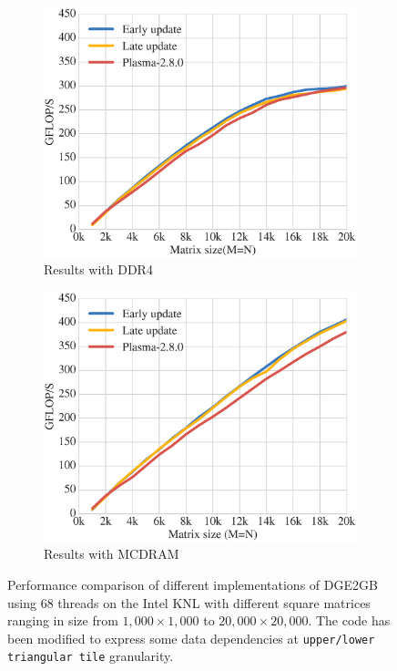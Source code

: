 \begin{figure}[h!]
  \begin{subfigure}[t]{0.5 \textwidth}
    \includegraphics[width=\textwidth]{fig/dge2gb_KNL_HACK}
    \caption{\label{fig:dge2gb_DDR4_HACK}
      Results with DDR4}
  \end{subfigure}
  \begin{subfigure}[t]{0.5 \textwidth}
    \includegraphics[width=\textwidth]{fig/dge2gb_KNL_HACK_HBW}
    \caption{\label{fig:dge2gb_HBW_HACK}
      Results with MCDRAM}
  \end{subfigure}
  \caption{Performance comparison of different implementations of
    DGE2GB using $68$ threads on the Intel KNL with different
    square matrices ranging in size from $1,000 \times 1,000$ to $20,000 \times 20,000$.
    The code has been modified to  express some
    data dependencies at \texttt{upper/lower triangular tile} granularity.}
  \label{fig:dge2gb_KNL_HACK}
\end{figure}



